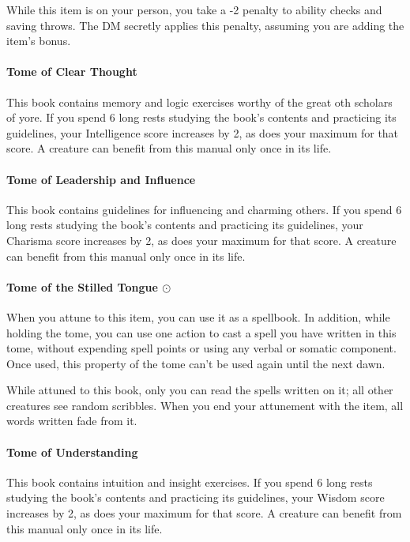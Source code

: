         While this item is on your person, you take a -2 penalty to ability checks and saving throws.
        The DM secretly applies this penalty, assuming you are adding the item's bonus.
    \paragraph{Tome of Clear Thought}
        This book contains memory and logic exercises worthy of the great oth scholars of yore.
        If you spend 6 long rests studying the book's contents and practicing its guidelines, your Intelligence score increases by 2, as does your maximum for that score.
        A creature can benefit from this manual only once in its life.
    \paragraph{Tome of Leadership and Influence}
        This book contains guidelines for influencing and charming others.
        If you spend 6 long rests studying the book's contents and practicing its guidelines, your Charisma score increases by 2, as does your maximum for that score.
        A creature can benefit from this manual only once in its life.
    \paragraph{Tome of the Stilled Tongue $\odot$}
        When you attune to this item, you can use it as a spellbook.
        In addition, while holding the tome, you can use one action to cast a spell you have written in this tome, without expending spell points or using any verbal or somatic component.
        Once used, this property of the tome can't be used again until the next dawn.

        While attuned to this book, only you can read the spells written on it; all other creatures see random scribbles.
        When you end your attunement with the item, all words written fade from it.
    \paragraph{Tome of Understanding}
        This book contains intuition and insight exercises.
        If you spend 6 long rests studying the book's contents and practicing its guidelines, your Wisdom score increases by 2, as does your maximum for that score.
        A creature can benefit from this manual only once in its life.
